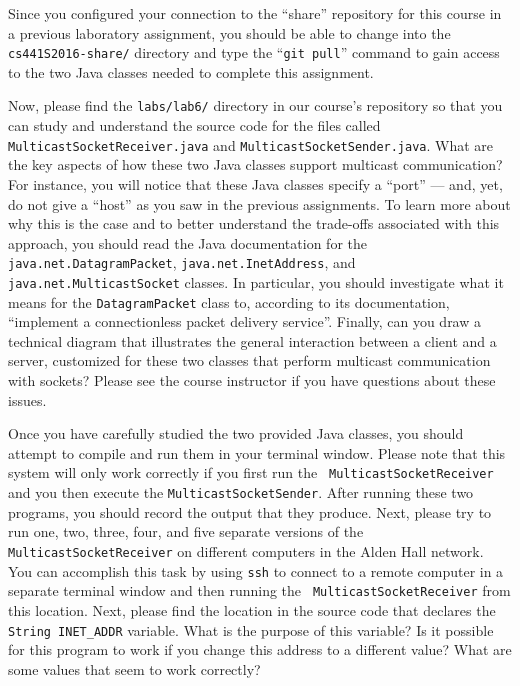 Since you configured your connection to the ``share'' repository for this course in a previous laboratory assignment,
you should be able to change into the {\tt cs441S2016-share/} directory and type the ``{\tt git pull}'' command to gain
access to the two Java classes needed to complete this assignment.

\begin{sloppypar}
  Now, please find the {\tt labs/lab6/} directory in our course's repository so that you can study and understand the
  source code for the files called {\tt MulticastSocketReceiver.java} and {\tt MulticastSocketSender.java}. What are the
  key aspects of how these two Java classes support multicast communication? For instance, you will notice that these
  Java classes specify a ``port'' --- and, yet, do not give a ``host'' as you saw in the previous assignments. To learn more
  about why this is the case and to better understand the trade-offs associated with this approach, you should read the
  Java documentation for the {\tt java.net.DatagramPacket}, {\tt java.net.InetAddress}, and {\tt
  java.net.MulticastSocket} classes. In particular, you should investigate what it means for the {\tt DatagramPacket}
  class to, according to its documentation, ``implement a connectionless packet delivery service''.  Finally, can you
  draw a technical diagram that illustrates the general interaction between a client and a server, customized for these
  two classes that perform multicast communication with sockets? Please see the course instructor if you have
  questions about these issues.
\end{sloppypar}

Once you have carefully studied the two provided Java classes, you should attempt to compile and run them in your
terminal window. Please note that this system will only work correctly if you first run the {\tt
MulticastSocketReceiver} and you then execute the {\tt MulticastSocketSender}. After running these two programs, you
should record the output that they produce. Next, please try to run one, two, three, four, and five separate versions of
the {\tt MulticastSocketReceiver} on different computers in the Alden Hall network. You can accomplish this task by
using {\tt ssh} to connect to a remote computer in a separate terminal window and then running the {\tt
  MulticastSocketReceiver} from this location. Next, please find the location in the source code that declares the {\tt
String INET\_ADDR} variable. What is the purpose of this variable? Is it possible for this program to work if you change
this address to a different value? What are some values that seem to work correctly?

